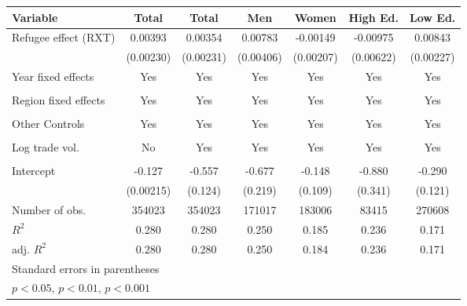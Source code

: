 \documentclass{article}
\begin{document}
{\begin{tabular}{l*{6}{c}}
Variable            &\multicolumn{1}{c}{Total}&\multicolumn{1}{c}{Total}&\multicolumn{1}{c}{Men}&\multicolumn{1}{c}{Women}&\multicolumn{1}{c}{High Ed.}&\multicolumn{1}{c}{Low Ed.}\\
\hline
Refugee effect (RXT)         &     0.00393         &     0.00354         &     0.00783         &    -0.00149         &    -0.00975         &     0.00843\sym{***}\\
            &   (0.00230)         &   (0.00231)         &   (0.00406)         &   (0.00207)         &   (0.00622)         &   (0.00227)         \\
[1em]
Year fixed effects         &       Yes&      Yes&                    Yes &                    Yes &       Yes&       Yes\\
            &          &            &                     &                     &            &           \\
[1em]
Region fixed effects     &      Yes&     Yes&     Yes&     Yes&       Yes&      Yes\\
            &            &           &            &          &            &            \\
[1em]
Other Controls      &      Yes&      Yes&      Yes&     Yes&      Yes&      Yes\\
            &           &            &            &           &            &           \\
[1em]
Log trade vol.   &                     No&    Yes&     Yes&   Yes        &      Yes  &    Yes         \\
            &                     &            &            &            &             &           \\
[1em]
Intercept      &      -0.127\sym{***}&      -0.557\sym{***}&      -0.677\sym{**} &      -0.148         &      -0.880\sym{**} &      -0.290\sym{*}  \\
            &   (0.00215)         &     (0.124)         &     (0.219)         &     (0.109)         &     (0.341)         &     (0.121)         \\
\hline
Number of obs.       &      354023         &      354023         &      171017         &      183006         &       83415         &      270608         \\
\(R^{2}\)   &       0.280         &       0.280         &       0.250         &       0.185         &       0.236         &       0.171         \\
adj. \(R^{2}\)&       0.280         &       0.280         &       0.250         &       0.184         &       0.236         &       0.171         \\
\hline\hline
\multicolumn{7}{l}{\footnotesize Standard errors in parentheses}\\
\multicolumn{7}{l}{\footnotesize \sym{*} \(p<0.05\), \sym{**} \(p<0.01\), \sym{***} \(p<0.001\)}\\
\end{tabular}
}
\end{document}
